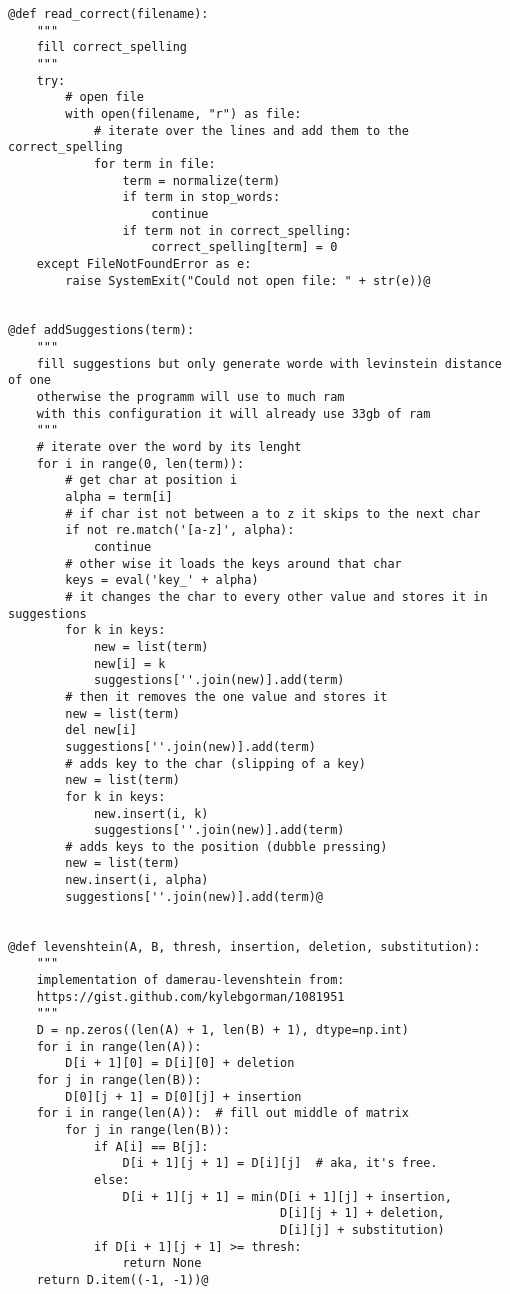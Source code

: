 \documentclass[12pt,pdftex,a4paper]{article}
\begin{document}
\begin{lstlisting}[style=base]
@def read_correct(filename):
    """
    fill correct_spelling
    """
    try:
        # open file
        with open(filename, "r") as file:
            # iterate over the lines and add them to the correct_spelling
            for term in file:
                term = normalize(term)
                if term in stop_words:
                    continue
                if term not in correct_spelling:
                    correct_spelling[term] = 0
    except FileNotFoundError as e:
        raise SystemExit("Could not open file: " + str(e))@


@def addSuggestions(term):
    """
    fill suggestions but only generate worde with levinstein distance of one
    otherwise the programm will use to much ram
    with this configuration it will already use 33gb of ram
    """
    # iterate over the word by its lenght
    for i in range(0, len(term)):
        # get char at position i
        alpha = term[i]
        # if char ist not between a to z it skips to the next char
        if not re.match('[a-z]', alpha):
            continue
        # other wise it loads the keys around that char
        keys = eval('key_' + alpha)
        # it changes the char to every other value and stores it in suggestions
        for k in keys:
            new = list(term)
            new[i] = k
            suggestions[''.join(new)].add(term)
        # then it removes the one value and stores it
        new = list(term)
        del new[i]
        suggestions[''.join(new)].add(term)
        # adds key to the char (slipping of a key)
        new = list(term)
        for k in keys:
            new.insert(i, k)
            suggestions[''.join(new)].add(term)
        # adds keys to the position (dubble pressing)
        new = list(term)
        new.insert(i, alpha)
        suggestions[''.join(new)].add(term)@


@def levenshtein(A, B, thresh, insertion, deletion, substitution):
    """
    implementation of damerau-levenshtein from:
    https://gist.github.com/kylebgorman/1081951
    """
    D = np.zeros((len(A) + 1, len(B) + 1), dtype=np.int)
    for i in range(len(A)):
        D[i + 1][0] = D[i][0] + deletion
    for j in range(len(B)):
        D[0][j + 1] = D[0][j] + insertion
    for i in range(len(A)):  # fill out middle of matrix
        for j in range(len(B)):
            if A[i] == B[j]:
                D[i + 1][j + 1] = D[i][j]  # aka, it's free.
            else:
                D[i + 1][j + 1] = min(D[i + 1][j] + insertion,
                                      D[i][j + 1] + deletion,
                                      D[i][j] + substitution)
            if D[i + 1][j + 1] >= thresh:
                return None
    return D.item((-1, -1))@



\end{lstlisting}
\end{document}
